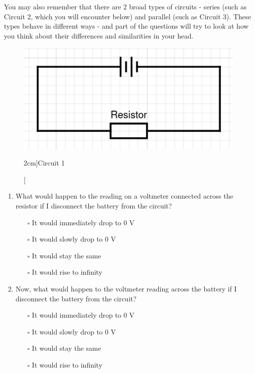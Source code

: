 \documentclass[a4paper,openany,nobib]{tufte-book}
\begin{document}
You may also remember that there are 2 broad types of circuits - series (such as Circuit 2, which you will encounter below) and parallel (such as Circuit 3). These types behave in different ways - and part of the questions will try to look at how you think about their differences and similarities in your head.
\newpage
{}
\begin{figure}[h!]
	\center
	\includegraphics[width=\linewidth]{simple}
	\caption[][2cm]{Circuit 1}
	\label{fig:marginfig}
\end{figure}
\begin{enumerate}
    \item What would happen to the reading on a voltmeter connected across the resistor if I disconnect the battery from the circuit?
		\begin{itemize}
\item[$\square$]It would immediately drop to $0$ V
	\item[$\square$]It would slowly drop to $0$ V
	\item[$\square$]It would stay the same
		\item[$\square$]It would rise to infinity
\end{itemize}
\item Now, what would happen to the voltmeter reading across the battery if I disconnect the battery from the circuit?
	\begin{itemize}
\item[$\square$]It would immediately drop to $0$ V
	\item[$\square$]It would slowly drop to $0$ V
	\item[$\square$]It would stay the same
		\item[$\square$]It would rise to infinity
	\end{itemize}
\end{enumerate}
\end{document}
